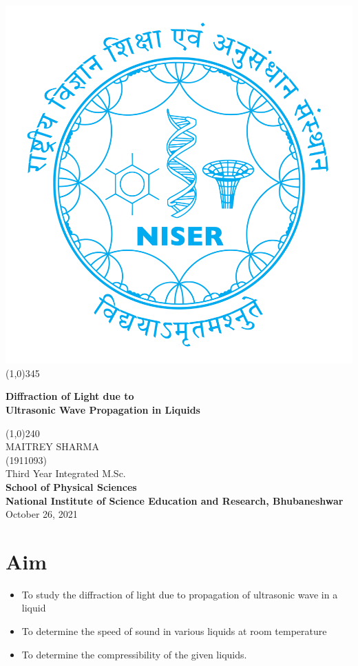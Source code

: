 \documentclass{article}
\begin{document}
\begin{titlepage}
\begin{center}
\includegraphics[scale=0.12]{document/niser.png}
\line(1,0){345}\\
[1mm]
\begin{large}
\textbf{\LARGE Diffraction of Light due to \\ \huge Ultrasonic Wave Propagation in Liquids}\\ 
\end{large}
\line(1,0){240}\\
[5cm]
\large MAITREY SHARMA\\
\small (1911093)\\
[3.5cm]
Third Year Integrated M.Sc.\\
\textbf{School of Physical Sciences}\\
\textbf{National Institute of Science Education and Research, Bhubaneshwar}\\
\small October 26, 2021
\end{center} 
\end{titlepage}
\newpage
\section{Aim}
\begin{itemize}
    \item To study the diffraction of light due to propagation of ultrasonic wave in a liquid
    \item To determine the speed of sound in various liquids at room temperature
    \item To determine the compressibility of the given liquids.
\end{itemize}
\end{document}
